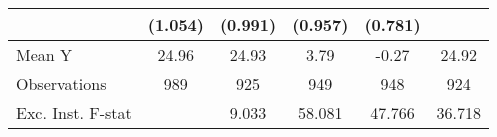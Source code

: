 {\begin{tabular}{l*{5}{c}}
            &     (1.054)         &     (0.991)         &     (0.957)         &     (0.781)         &                     \\
\midrule
Mean Y      &       24.96         &       24.93         &        3.79         &       -0.27         &       24.92         \\
Observations&         989         &         925         &         949         &         948         &         924         \\
Exc. Inst. F-stat&                     &       9.033         &      58.081         &      47.766         &      36.718         \\
\bottomrule
\end{tabular}
}
